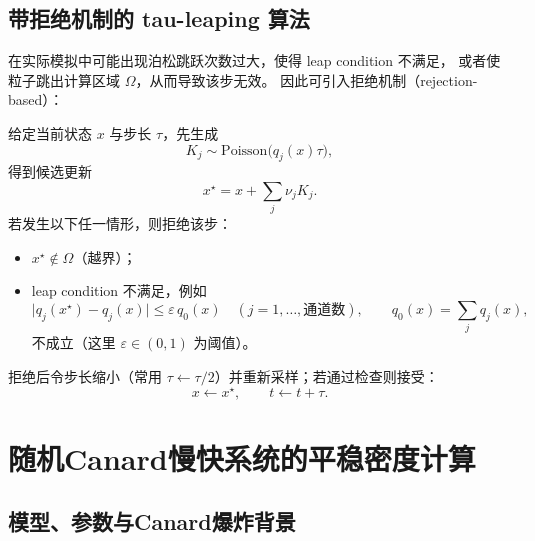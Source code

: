	\subsection{带拒绝机制的 tau-leaping 算法}
	
	在实际模拟中可能出现泊松跳跃次数过大，使得 leap condition 不满足，
	或者使粒子跳出计算区域 $\Omega$，从而导致该步无效。
	因此可引入拒绝机制（rejection-based）：
	
	给定当前状态 $x$ 与步长 $\tau$，先生成
	\[
	K_j \sim \mathrm{Poisson}\bigl(q_j(x)\tau\bigr),
	\]
	得到候选更新
	\[
	x^\star = x+\sum_j \nu_j K_j.
	\]
	若发生以下任一情形，则拒绝该步：
	\begin{itemize}
		\item $x^\star\notin \Omega$（越界）；
		\item leap condition 不满足，例如
		\begin{equation}\label{eq:reject_leap}
			\bigl|q_j(x^\star)-q_j(x)\bigr|\le \varepsilon\,q_0(x)
			\quad (j=1,\dots,\text{通道数}),
			\qquad q_0(x)=\sum_j q_j(x),
		\end{equation}
		不成立（这里 $\varepsilon\in(0,1)$ 为阈值）。
	\end{itemize}
	拒绝后令步长缩小（常用 $\tau\leftarrow\tau/2$）并重新采样；若通过检查则接受：
	\[
	x\leftarrow x^\star,\qquad t\leftarrow t+\tau.
	\]
	
	
	
	\section{随机Canard慢快系统的平稳密度计算}\label{subsec:canard}
	
	\subsection{模型、参数与Canard爆炸背景}
	
